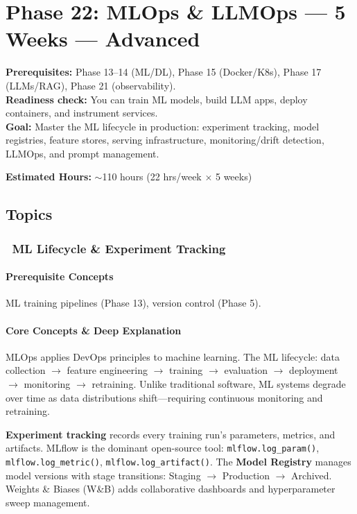 \documentclass[11pt, a4paper, oneside]{report}
\newcommand{\mustmaster}[1]{\subsubsection{\texorpdfstring{\fcolorbox{blue!40!black}{blue!8}{\footnotesize\bfseries\color{blue!40!black} MUST MASTER}~#1}{#1}}}
\newcommand{\arrow}{$\rightarrow$}
\begin{document}
\section[Phase 22: MLOps \& LLMOps]{Phase 22: MLOps \& LLMOps --- 5 Weeks --- Advanced}

\begin{prereqbox}
\textbf{Prerequisites:} Phase 13--14 (ML/DL), Phase 15 (Docker/K8s), Phase 17 (LLMs/RAG), Phase 21 (observability).\\
\textbf{Readiness check:} You can train ML models, build LLM apps, deploy containers, and instrument services.\\
\textbf{Goal:} Master the ML lifecycle in production: experiment tracking, model registries, feature stores, serving infrastructure, monitoring/drift detection, LLMOps, and prompt management.


\textbf{Estimated Hours:} $\sim$110 hours (22 hrs/week $\times$ 5 weeks)
\end{prereqbox}

\subsection*{Topics}

\mustmaster{ML Lifecycle \& Experiment Tracking}

\paragraph{Prerequisite Concepts} ML training pipelines (Phase 13), version control (Phase 5).

\paragraph{Core Concepts \& Deep Explanation} MLOps applies DevOps principles to machine learning. The ML lifecycle: data collection \arrow{} feature engineering \arrow{} training \arrow{} evaluation \arrow{} deployment \arrow{} monitoring \arrow{} retraining. Unlike traditional software, ML systems degrade over time as data distributions shift---requiring continuous monitoring and retraining.

\textbf{Experiment tracking} records every training run's parameters, metrics, and artifacts. MLflow is the dominant open-source tool: \texttt{mlflow.log\_param()}, \texttt{mlflow.log\_metric()}, \texttt{mlflow.log\_artifact()}. The \textbf{Model Registry} manages model versions with stage transitions: Staging \arrow{} Production \arrow{} Archived. Weights \& Biases (W\&B) adds collaborative dashboards and hyperparameter sweep management.
\end{document}

